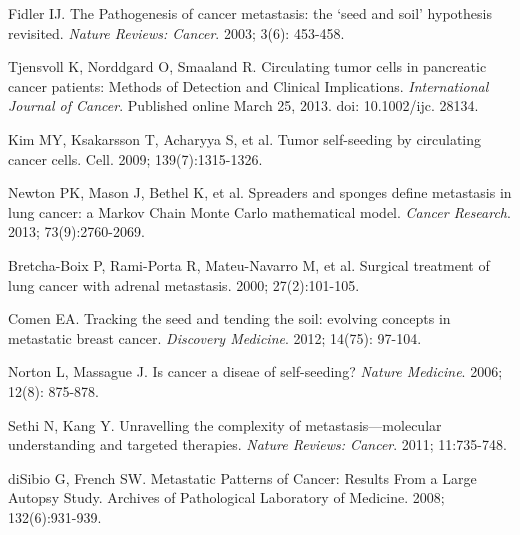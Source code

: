 \documentclass[letterpaper,12pt]{article}
\begin{document}
\begin{thebibliography}{9}

  Fidler IJ.
  The Pathogenesis of cancer metastasis: the ‘seed and soil’ hypothesis revisited.
  \emph{Nature Reviews: Cancer}.
  2003; 3(6): 453-458.

  Tjensvoll K, Norddgard O, Smaaland R.
  Circulating tumor cells in pancreatic cancer patients: Methods of Detection and Clinical Implications.
  \emph{International Journal of Cancer}.
  Published online March 25, 2013. doi: 10.1002/ijc. 28134.

  Kim MY, Ksakarsson T, Acharyya S, et al.
  Tumor self-seeding by circulating cancer cells.
  Cell.
  2009; 139(7):1315-1326.

  Newton PK, Mason J, Bethel K, et al.
  Spreaders and sponges define metastasis in lung cancer: a Markov Chain Monte Carlo mathematical model.
  \emph{Cancer Research}.
  2013; 73(9):2760-2069.

  Bretcha-Boix P, Rami-Porta R, Mateu-Navarro M, et al.
  Surgical treatment of lung cancer with adrenal metastasis.
  2000; 27(2):101-105.

Comen EA. Tracking the seed and tending the soil: evolving concepts in metastatic breast cancer. \emph{Discovery Medicine}. 2012; 14(75): 97-104.

Norton L, Massague J. Is cancer a diseae of self-seeding? \emph{Nature Medicine}. 2006; 12(8): 875-878.

Sethi N, Kang Y. Unravelling the complexity of metastasis---molecular understanding and targeted therapies. \emph{Nature Reviews: Cancer}. 2011; 11:735-748.

diSibio G, French SW. Metastatic Patterns of Cancer: Results From a Large Autopsy Study. Archives of Pathological Laboratory of Medicine. 2008; 132(6):931-939.

\end{thebibliography}
\end{document}
